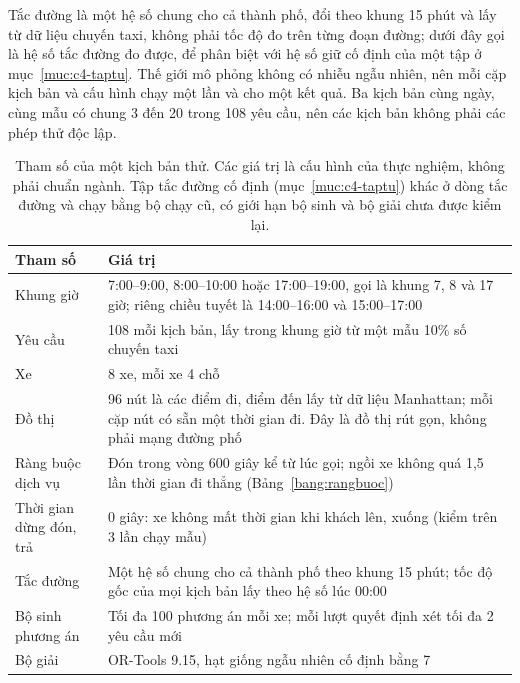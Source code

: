 Tắc đường là một hệ số chung cho cả thành phố, đổi theo khung 15 phút và lấy từ dữ liệu chuyến taxi, không phải
tốc độ đo trên từng đoạn đường; dưới đây gọi là hệ số tắc đường đo được, để phân biệt với hệ số giữ cố định của một
tập ở mục~\ref{muc:c4-taptu}. Thế giới mô phỏng không có nhiễu ngẫu nhiên, nên mỗi cặp kịch bản và cấu hình chạy một
lần và cho một kết quả. Ba kịch bản cùng ngày, cùng mẫu có chung 3 đến 20 trong 108 yêu cầu, nên các kịch bản không
phải các phép thử độc lập.

\begin{table}[htbp]
\centering
\caption{Tham số của một kịch bản thử. Các giá trị là cấu hình của thực nghiệm, không phải chuẩn ngành. Tập tắc
đường cố định (mục~\ref{muc:c4-taptu}) khác ở dòng tắc đường và chạy bằng bộ chạy cũ, có giới hạn bộ sinh và bộ
giải chưa được kiểm lại.}
\label{bang:c4-thamso}
\small
\begin{tabular}{@{}p{4.0cm}p{11.0cm}@{}}
\toprule
\textbf{Tham số} & \textbf{Giá trị}\\
\midrule
Khung giờ & 7:00--9:00, 8:00--10:00 hoặc 17:00--19:00, gọi là khung 7, 8 và 17 giờ; riêng chiều tuyết
là 14:00--16:00 và 15:00--17:00\\
Yêu cầu & 108 mỗi kịch bản, lấy trong khung giờ từ một mẫu 10\% số chuyến taxi\\
Xe & 8 xe, mỗi xe 4 chỗ\\
Đồ thị & 96 nút là các điểm đi, điểm đến lấy từ dữ liệu Manhattan; mỗi cặp nút có sẵn một thời gian đi. Đây là
đồ thị rút gọn, không phải mạng đường phố\\
Ràng buộc dịch vụ & Đón trong vòng 600 giây kể từ lúc gọi; ngồi xe không quá 1,5 lần thời gian đi
thẳng (Bảng~\ref{bang:rangbuoc})\\
Thời gian dừng đón, trả & 0 giây: xe không mất thời gian khi khách lên, xuống (kiểm trên 3 lần chạy mẫu)\\
Tắc đường & Một hệ số chung cho cả thành phố theo khung 15 phút; tốc độ gốc của mọi kịch bản lấy theo hệ số lúc
00:00\\
Bộ sinh phương án & Tối đa 100 phương án mỗi xe; mỗi lượt quyết định xét tối đa 2 yêu cầu mới\\
Bộ giải & OR-Tools 9.15, hạt giống ngẫu nhiên cố định bằng 7\\
\bottomrule
\end{tabular}
\end{table}

